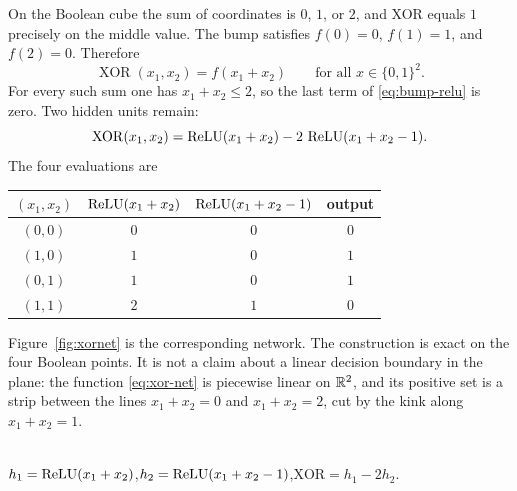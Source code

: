 On the Boolean cube the sum of coordinates is \(0\), \(1\), or \(2\), and XOR equals \(1\) precisely on the middle value. The bump satisfies \(f(0)=0\), \(f(1)=1\), and \(f(2)=0\). Therefore
\[
  \operatorname{XOR}(x_1,x_2) = f(x_1+x_2)
  \qquad\text{for all } x\in\{0,1\}^2.
\]
For every such sum one has \(x_1+x_2\le 2\), so the last term of \eqref{eq:bump-relu} is zero. Two hidden units remain:
\begin{equation}
  \operatorname{XOR}(x_1,x_2)
  =
  \operatorname{ReLU}(x_1+x_2) - 2\,\operatorname{ReLU}(x_1+x_2-1).
  \label{eq:xor-net}
\end{equation}
The four evaluations are
\begin{center}
\begin{tabular}{@{}cccc@{}}
\toprule
\((x_1,x_2)\) & \(\operatorname{ReLU}(x_1+x_2)\) & \(\operatorname{ReLU}(x_1+x_2-1)\) & output \\
\midrule
\((0,0)\) & \(0\) & \(0\) & \(0\) \\
\((1,0)\) & \(1\) & \(0\) & \(1\) \\
\((0,1)\) & \(1\) & \(0\) & \(1\) \\
\((1,1)\) & \(2\) & \(1\) & \(0\) \\
\bottomrule
\end{tabular}
\end{center}
Figure~\ref{fig:xornet} is the corresponding network. The construction is exact on the four Boolean points. It is not a claim about a linear decision boundary in the plane: the function \eqref{eq:xor-net} is piecewise linear on \(\mathbb{R}^2\), and its positive set is a strip between the lines \(x_1+x_2=0\) and \(x_1+x_2=2\), cut by the kink along \(x_1+x_2=1\).

\begin{center}
\\[0.4em]
{\small $h_1=\operatorname{ReLU}(x_1+x_2)$,\quad $h_2=\operatorname{ReLU}(x_1+x_2-1)$,\quad $\mathrm{XOR}=h_1-2h_2$.}
\label{fig:xornet}
\end{center}

